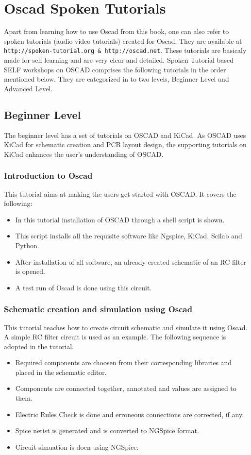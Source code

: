 \chapter {Oscad Spoken Tutorials}
\label{chap10}
Apart from learning how to use Oscad from this book, one can also refer to spoken tutorials (audio-video tutorials) created for Oscad. They are available at {\tt http://spoken-tutorial.org \& http://oscad.net}. These tutorials are basicaly made for self learning and are very clear and detailed. Spoken Tutorial based SELF workshops on OSCAD comprises the following tutorials in the order mentioned below. They are categorized in to two levels, Beginner Level and Advanced Level.


\section{Beginner Level}
The beginner level has a set of tutorials on OSCAD and KiCad. As OSCAD uses KiCad for schematic creation and PCB layout design, the supporting tutorials on KiCad enhances the user's understanding of OSCAD.


\subsection {Introduction to Oscad}
 This tutorial aims at making the users get started with OSCAD. It covers the following:

\begin{itemize}
\item In this tutorial installation of OSCAD through a shell script is shown. 
\item This script installs all the requisite software like Ngspice, KiCad, Scilab and Python.
\item After installation of all software, an already created schematic of an RC filter is opened.
\item A test run of Oscad is done using this circuit.
\end{itemize}

\subsection {Schematic creation and simulation using Oscad}
This tutorial teaches how to create circuit schematic and simulate it using Oscad. A simple RC filter circuit is used as an example. The following sequence is adopted in the tutorial.
\begin{itemize}
\item Required components are choosen from their corresponding libraries and placed in the schematic editor.
\item Components are connected together, annotated and values are assigned to them.
\item Electric Rules Check is done and erroneous connections are corrected, if any.
\item Spice netist is generated and is converted to NGSpice format.
\item Circuit simuation is doen using NGSpice. 
\end{itemize}

